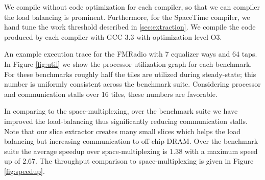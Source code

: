 We compile without code optimization for each compiler, so that we can
compiler the load balancing is prominent.  Furthermore, for the
SpaceTime compiler, we hand tune the work threshold described in
\ref{sec:extraction}.  We compile the code produced by each compiler
with GCC 3.3 with optimization level O3.

An example execution trace for the FMRadio with 7 equalizer ways and
64 taps.  In Figure \ref{fig:util} we show the processor utilization
graph for each benchmark. For these benchmarks roughly half the tiles
are utilized during steady-state; this number is uniformly consistent
across the benchmark suite.  Considering processor and communication
stalls over 16 tiles, these numbers are favorable.

In comparing to the space-multiplexing, over the benchmark suite we
have improved the load-balancing thus significantly reducing
communication stalls.  Note that our slice extractor creates many
small slices which helps the load balancing but increasing
communication to off-chip DRAM.  Over the benchmark suite the average
speedup over space-multiplexing is 1.38 with a maximum speed up of
2.67. The throughput comparison to space-multiplexing is given in
Figure \ref{fig:speedup}.
